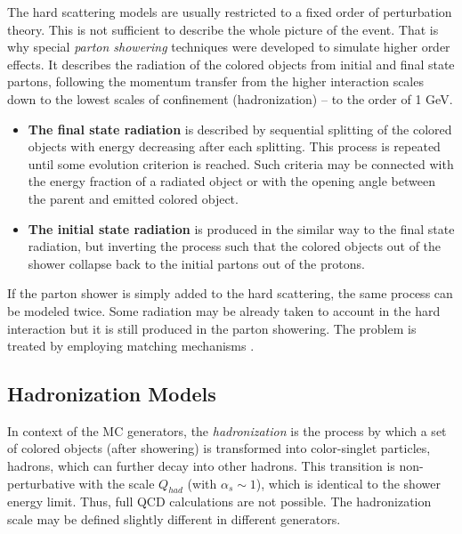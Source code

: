 The hard scattering models are usually restricted to a fixed order of perturbation theory. This is not sufficient to describe the 
whole picture of the event. That is why special \textit{parton showering} techniques were developed to simulate 
higher order effects. It describes the radiation of the colored objects from initial and final state partons,
following the momentum transfer from the higher interaction scales down to the lowest scales of confinement (hadronization) --
to the order of 1 GeV.


\begin{itemize}
 \item \textbf{The final state radiation} is described by sequential splitting of the colored objects with energy decreasing
 after each splitting. This process is repeated until some evolution criterion is reached. Such criteria may be connected
 with the energy fraction of a radiated object or with the opening angle between the parent and emitted colored object.
 
 \item \textbf{The initial state radiation} is produced in the similar way to the final state radiation, but inverting
 the process such that the colored objects out of the shower collapse back to the initial partons out of the protons.
\end{itemize}

If the parton shower is simply added to the hard scattering, the same process can be modeled twice. Some radiation
may be already taken to account in the hard interaction but it is still produced in the parton showering. The problem 
is treated by employing matching mechanisms \cite{Buckley:2011ms}.

\subsection{Hadronization Models}

In context of the MC generators, the \textit{hadronization} is the process by which a set of colored objects (after showering)
is transformed into color-singlet particles, hadrons, which can further decay into other hadrons. This transition is non-perturbative
with the scale $Q_{had}$ (with $\alpha_{s} \sim 1$), which is identical to the shower energy limit. Thus, full QCD calculations
are not possible. The hadronization scale may be defined slightly different in different generators.
% 

